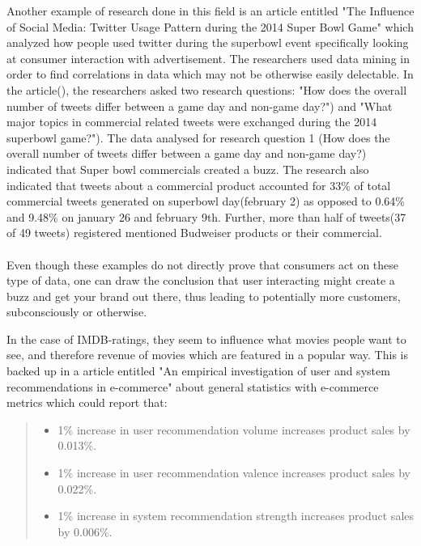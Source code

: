 Another example of research done in this field is an article entitled "The Influence of Social Media: Twitter Usage Pattern during the 2014 Super Bowl Game" which analyzed how people used twitter during the superbowl event specifically looking at consumer interaction with advertisement.
The researchers used data mining in order to find correlations in data which may not be otherwise easily delectable. 
In the article(\cite{HyeonjeongShin2015}), the researchers asked two research questions: "How does the overall number of tweets differ between a game day and non-game day?"\cite{HyeonjeongShin2015}) and "What major topics in commercial related tweets were exchanged during the 2014 superbowl game?"\cite{HyeonjeongShin2015}). The data analysed for research question 1 (How does the overall number of tweets differ between a game day and non-game day?) indicated that Super bowl commercials created a buzz. The research also indicated that tweets about a commercial product accounted for 33\% of total commercial tweets generated on superbowl day(february 2) as opposed to 0.64\% and 9.48\% on january 26 and february 9th. Further, more than half of tweets(37 of 49 tweets) registered mentioned Budweiser products or their commercial. 
\\
\\
Even though these examples do not directly prove that consumers act on these type of data, one can draw the conclusion that user interacting might create a buzz and get your brand out there, thus leading to potentially more customers, subconsciously or otherwise. 

In the case of IMDB-ratings, they seem to influence what movies people want to see, and therefore revenue of movies which are featured in a popular way. This is backed up in a article entitled "An empirical investigation of user and system recommendations in e-commerce" about general statistics with e-commerce metrics \cite{Lin2014111} which could report that:
\begin{quote}
\begin{itemize}
\item {1\% increase in user recommendation volume increases product sales by 0.013\%.}
\item {1\% increase in user recommendation valence increases product sales by 0.022\%.}
\item {1\% increase in system recommendation strength increases product sales by 0.006\%.}
\end{itemize}
\end{quote}

